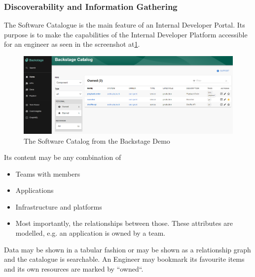 \documentclass[a4paper,12pt]{article}
\begin{document}
    \subsubsection{Discoverability and Information Gathering}
    \label{sssec:disc}
    The Software Catalogue is the main feature of an Internal Developer Portal.
    Its purpose is to make the capabilities of the Internal Developer Platform accessible for an engineer as seen in the
    screenshot at\ref{fig:catalog}.

    \begin{figure}
        \includegraphics[width=\linewidth]{backstage_catalog}
        \caption{The Software Catalog from the Backstage Demo\parencite{backstagedemo}}
        \label{fig:catalog}
    \end{figure}
    Its content may be any combination of
    \begin{itemize}
        \item Teams with members
        \item Applications
        \item Infrastructure and platforms
        \item Most importantly, the relationships between those. These attributes are modelled, e.g. an application is owned by a team.
    \end{itemize}
    Data may be shown in a tabular fashion or may be shown as a relationship graph and the catalogue is searchable.
    An Engineer may bookmark its favourite items and its own resources are marked by ``owned``.
\end{document}
